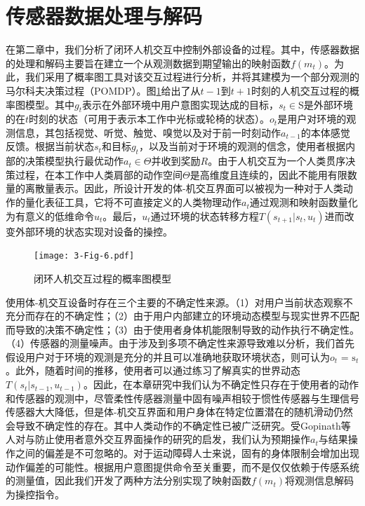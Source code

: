\section{传感器数据处理与解码} 
在第二章中，我们分析了闭环人机交互中控制外部设备的过程。其中，传感器数据的处理和解码主要旨在建立一个从观测数据到期望输出的映射函数$f(m_t)$。为此，我们采用了概率图工具对该交互过程进行分析，并将其建模为一个部分观测的马尔科夫决策过程（POMDP）。图\ref{3-fig-6}给出了从$t-1$到$t+1$时刻的人机交互过程的概率图模型。其中${g_t}$表示在外部环境中用户意图实现达成的目标，${s_t} \in {\text{S}}$是外部环境的在$t$时刻的状态（可用于表示本工作中光标或轮椅的状态）。${o_t}$是用户对环境的观测信息，其包括视觉、听觉、触觉、嗅觉以及对于前一时刻动作${a_{t - 1}}$的本体感觉反馈。根据当前状态${s_t}$和目标${g_t}$，以及当前对于环境的观测的信念，使用者根据内部的决策模型执行最优动作${a_t} \in \Theta $并收到奖励$R$。由于人机交互为一个人类贯序决策过程，在本工作中人类肩部的动作空间$\Theta $是高维度且连续的，因此不能用有限数量的离散量表示。因此，所设计开发的体-机交互界面可以被视为一种对于人类动作的量化表征工具，它将不可直接定义的人类物理动作${a_t}$通过观测和映射函数量化为有意义的低维命令${u_t}$。最后，${u_t}$通过环境的状态转移方程$T({s_{t+1}}|{s_{t}},{u_{t}})$进而改变外部环境的状态实现对设备的操控。

\begin{figure}[htb]
    \centering
    \texttt{[image: 3-Fig-6.pdf]}
    \caption{闭环人机交互过程的概率图模型}
    \label{3-fig-6}
\end{figure} 

使用体-机交互设备时存在三个主要的不确定性来源。（1）对用户当前状态观察不充分而存在的不确定性；（2）由于用户内部建立的环境动态模型与现实世界不匹配而导致的决策不确定性；（3）由于使用者身体机能限制导致的动作执行不确定性。（4）传感器的测量噪声。由于涉及到多项不确定性来源导致难以分析，我们首先假设用户对于环境的观测是充分的并且可以准确地获取环境状态，则可认为${o_t}{\text{ = }}{{\text{s}}_t}$。此外，随着时间的推移，使用者可以通过练习了解真实的世界动态$T({s_t}|{s_{t - 1}},{u_{t - 1}})$。因此，在本章研究中我们认为不确定性只存在于使用者的动作和传感器的观测中，尽管柔性传感器测量中固有噪声相较于惯性传感器与生理信号传感器大大降低，但是体-机交互界面和用户身体在特定位置潜在的随机滑动仍然会导致不确定性的存在。其中人类动作的不确定性已被广泛研究\cite{churchlandCentralSourceMovement2006,vanbeersRoleExecutionNoise2004, desantisGuidingFunctionalReorganization2020a}。受Gopinath等人对与防止使用者意外交互界面操作的研究\cite{gopinathCustomizedHandlingUnintended2021}的启发，我们认为预期操作$a_t$与结果操作之间的偏差是不可忽略的。对于运动障碍人士来说，固有的身体限制会增加出现动作偏差的可能性。根据用户意图提供命令至关重要，而不是仅仅依赖于传感系统的测量值，因此我们开发了两种方法分别实现了映射函数$f(m_t)$将观测信息解码为操控指令。  

